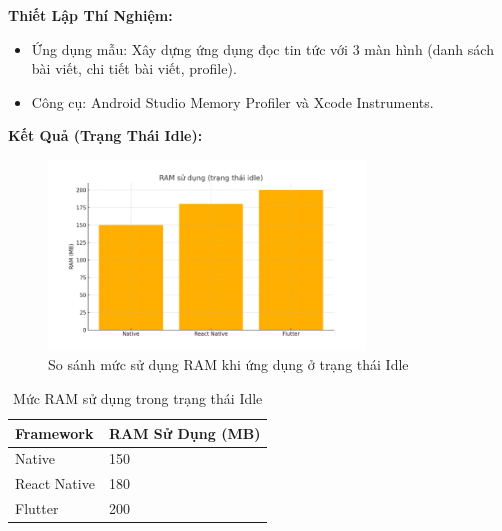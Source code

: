     \begin{flushleft}
      \hspace*{0.8cm}\textbf{Thiết Lập Thí Nghiệm:}
      \setlength{\leftmargini}{1.5cm}
      \begin{itemize}
        \item Ứng dụng mẫu: Xây dựng ứng dụng đọc tin tức với 3 màn hình (danh sách bài viết, chi tiết bài viết, profile).
        \item Công cụ: Android Studio Memory Profiler và Xcode Instruments.
      \end{itemize}
    \end{flushleft}
    
    \vspace{0.5em}
    
    \begin{flushleft}
      \hspace*{0.8cm}\textbf{Kết Quả (Trạng Thái Idle):}
    \end{flushleft}
    
    \begin{figure}[H]
        \centering
        \includegraphics[width=0.75\textwidth]{images/idle_memory_usage.png}
        \caption{So sánh mức sử dụng RAM khi ứng dụng ở trạng thái Idle}
    \end{figure}
    
    \vspace{0.5em}
    
    \begin{table}[H]
      \centering
      \begin{tabular}{|l|p{5cm}|}
      \hline
      \textbf{Framework} & \textbf{RAM Sử Dụng (MB)} \\
      \hline
      Native       & 150 \\
      React Native & 180 \\
      Flutter      & 200 \\
      \hline
      \end{tabular}
      \caption{Mức RAM sử dụng trong trạng thái Idle}
  \end{table}
  

